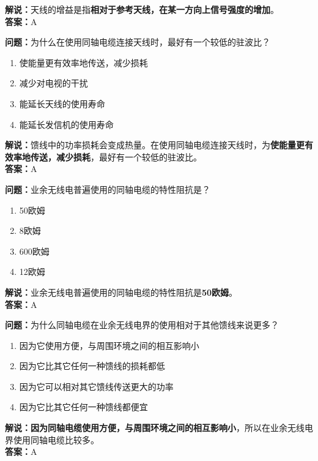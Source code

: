 \textbf{解说：}天线的增益是指\textbf{相对于参考天线，在某一方向上信号强度的增加}。\\\textbf{答案：}A%



\textbf{问题：}为什么在使用同轴电缆连接天线时，最好有一个较低的驻波比？

\begin{enumerate}[label=\Alph*), leftmargin=1.5cm]
	\item 使能量更有效率地传送，减少损耗
	\item 减少对电视的干扰
	\item 能延长天线的使用寿命
	\item 能延长发信机的使用寿命
\end{enumerate}

\textbf{解说：}馈线中的功率损耗会变成热量。在使用同轴电缆连接天线时，为\textbf{使能量更有效率地传送，减少损耗}，最好有一个较低的驻波比。\\\textbf{答案：}A%



\textbf{问题：}业余无线电普遍使用的同轴电缆的特性阻抗是？

\begin{enumerate}[label=\Alph*), leftmargin=1.5cm]
	\item 50欧姆
	\item 8欧姆
	\item 600欧姆
	\item 12欧姆
\end{enumerate}

\textbf{解说：}业余无线电普遍使用的同轴电缆的特性阻抗是\textbf{50欧姆}。\\\textbf{答案：}A%



\textbf{问题：}为什么同轴电缆在业余无线电界的使用相对于其他馈线来说更多？

\begin{enumerate}[label=\Alph*), leftmargin=1.5cm]
	\item 因为它使用方便，与周围环境之间的相互影响小
	\item 因为它比其它任何一种馈线的损耗都低
	\item 因为它可以相对其它馈线传送更大的功率
	\item 因为它比其它任何一种馈线都便宜
\end{enumerate}

\textbf{解说：}\textbf{因为同轴电缆使用方便，与周围环境之间的相互影响小}，所以在业余无线电界使用同轴电缆比较多。\\\textbf{答案：}A%



